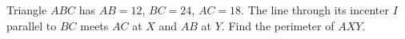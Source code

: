 Triangle $ABC$ has $AB=12$, $BC=24$, $AC=18$. The line through its incenter $I$ parallel to $BC$ meets $AC$ at $X$ and $AB$ at $Y$. Find the perimeter of $AXY$.
